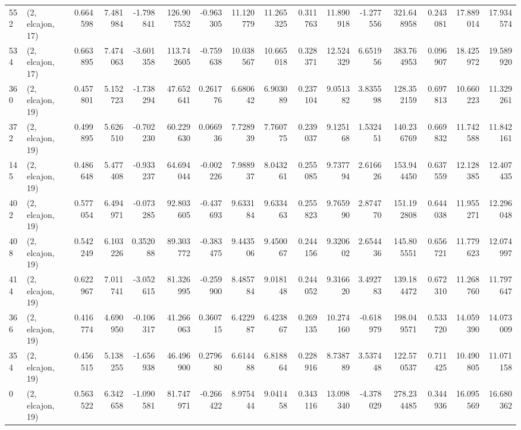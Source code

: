 \begin{tabular}{llrrrrrrrrrrrrrr}
552 &  (2, elcajon, 17) &   0.664598 &   7.481984 &  -1.798841 &   126.907552 &  -0.963305 &  11.120779 &  11.265325 &  0.311763 &  11.890918 &  -1.277556 &    321.648958 &   0.243081 &   17.889014 &   17.934574 \\
534 &  (2, elcajon, 17) &   0.663895 &   7.474063 &  -3.601358 &   113.742605 &  -0.759638 &  10.038567 &  10.665018 &  0.328371 &  12.524329 &   6.651956 &    383.764953 &   0.096907 &   18.425972 &   19.589920 \\
360 &  (2, elcajon, 19) &   0.457801 &   5.152723 &  -1.738294 &    47.652641 &   0.261776 &   6.680642 &   6.903089 &  0.237104 &   9.051382 &   3.835598 &    128.352159 &   0.697813 &   10.660223 &   11.329261 \\
372 &  (2, elcajon, 19) &   0.499895 &   5.626510 &  -0.702230 &    60.229630 &   0.066936 &   7.728939 &   7.760775 &  0.239037 &   9.125168 &   1.532451 &    140.236769 &   0.669832 &   11.742588 &   11.842161 \\
145 &  (2, elcajon, 19) &   0.486648 &   5.477408 &  -0.933237 &    64.694044 &  -0.002226 &   7.988937 &   8.043261 &  0.255085 &   9.737794 &   2.616626 &    153.944450 &   0.637559 &   12.128385 &   12.407435 \\
402 &  (2, elcajon, 19) &   0.577054 &   6.494971 &  -0.073285 &    92.803605 &  -0.437693 &   9.633184 &   9.633463 &  0.255823 &   9.765990 &   2.874770 &    151.192808 &   0.644038 &   11.955271 &   12.296048 \\
408 &  (2, elcajon, 19) &   0.542249 &   6.103226 &   0.352088 &    89.303772 &  -0.383475 &   9.443506 &   9.450067 &  0.244156 &   9.320602 &   2.654436 &    145.805551 &   0.656721 &   11.779623 &   12.074997 \\
414 &  (2, elcajon, 19) &   0.622967 &   7.011741 &  -3.052615 &    81.326995 &  -0.259900 &   8.485784 &   9.018148 &  0.244052 &   9.316620 &   3.492783 &    139.184472 &   0.672310 &   11.268760 &   11.797647 \\
366 &  (2, elcajon, 19) &   0.416774 &   4.690950 &  -0.106317 &    41.266063 &   0.360715 &   6.422987 &   6.423867 &  0.269135 &  10.274160 &  -0.618979 &    198.049571 &   0.533720 &   14.059390 &   14.073009 \\
354 &  (2, elcajon, 19) &   0.456515 &   5.138255 &  -1.656938 &    46.496900 &   0.279680 &   6.614488 &   6.818864 &  0.228916 &   8.738789 &   3.537448 &    122.570537 &   0.711425 &   10.490805 &   11.071158 \\
0   &  (2, elcajon, 19) &   0.563522 &   6.342658 &  -1.090581 &    81.747971 &  -0.266422 &   8.975444 &   9.041458 &  0.343116 &  13.098340 &  -4.378029 &    278.234485 &   0.344936 &   16.095569 &   16.680362 \\

\end{tabular}
